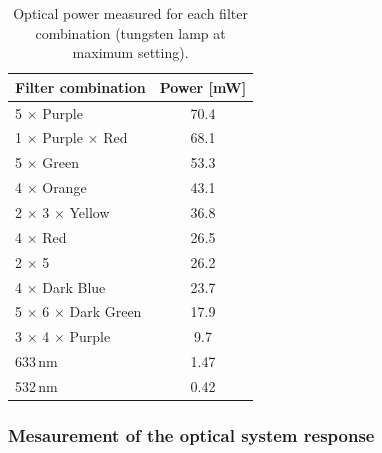 \begin{table}[H]
    \centering
    \caption{Optical power measured for each filter combination (tungsten lamp at maximum setting).}
    \label{tab:optical_power}
    \begin{tabular}{|l|c|}
        \hline
        \rowcolor[HTML]{EFEFEF}
        \textbf{Filter combination} & \textbf{Power [mW]} \\ \hline
        5 $\times$ Purple               & 70.4 \\ \hline
        1 $\times$ Purple $\times$ Red  & 68.1 \\ \hline
        5 $\times$ Green                & 53.3 \\ \hline
        4 $\times$ Orange               & 43.1 \\ \hline
        2 $\times$ 3 $\times$ Yellow    & 36.8 \\ \hline
        4 $\times$ Red                  & 26.5 \\ \hline
        2 $\times$ 5                    & 26.2 \\ \hline
        4 $\times$ Dark Blue            & 23.7 \\ \hline
        5 $\times$ 6 $\times$ Dark Green& 17.9 \\ \hline
        3 $\times$ 4 $\times$ Purple    & 9.7  \\ \hline
        633\,nm                         & 1.47 \\ \hline
        532\,nm                         & 0.42 \\ \hline
    \end{tabular}
\end{table}

\subsubsection{Mesaurement of the optical system response}
\label{subsub:captura_sistemas_opticos}


    
